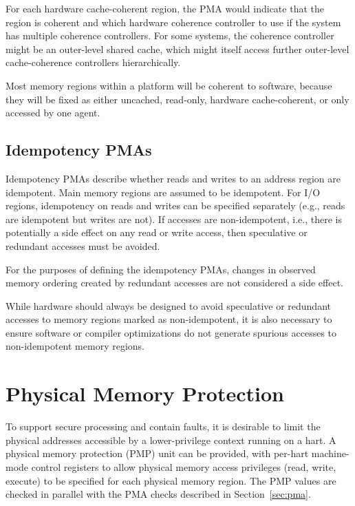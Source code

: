 \begin{commentary}
For each hardware cache-coherent region, the PMA would indicate that
the region is coherent and which hardware coherence controller to use
if the system has multiple coherence controllers.  For some systems,
the coherence controller might be an outer-level shared cache, which
might itself access further outer-level cache-coherence controllers
hierarchically.

Most memory regions within a platform will be coherent to software,
because they will be fixed as either uncached, read-only, hardware
cache-coherent, or only accessed by one agent.
\end{commentary}

\subsection{Idempotency PMAs}

Idempotency PMAs describe whether reads and writes to an address
region are idempotent.  Main memory regions are assumed to be
idempotent.  For I/O regions, idempotency on reads and writes can be
specified separately (e.g., reads are idempotent but writes are not).
If accesses are non-idempotent, i.e., there is potentially a side
effect on any read or write access, then speculative or redundant
accesses must be avoided.

For the purposes of defining the idempotency PMAs, changes in observed
memory ordering created by redundant accesses are not considered a
side effect.

\begin{commentary}
While hardware should always be designed to avoid speculative or
redundant accesses to memory regions marked as non-idempotent, it is
also necessary to ensure software or compiler optimizations do not
generate spurious accesses to non-idempotent memory regions.
\end{commentary}

\section{Physical Memory Protection}
\label{sec:pmp}

To support secure processing and contain faults, it is desirable to
limit the physical addresses accessible by a lower-privilege context
running on a hart.  A physical memory protection (PMP) unit can be
provided, with per-hart machine-mode control registers to allow
physical memory access privileges (read, write, execute) to be
specified for each physical memory region.  The PMP values are checked
in parallel with the PMA checks described in Section~\ref{sec:pma}.

